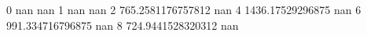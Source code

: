 0 nan nan
1 nan nan
2 765.2581176757812 nan
4 1436.17529296875 nan
6 991.334716796875 nan
8 724.9441528320312 nan

